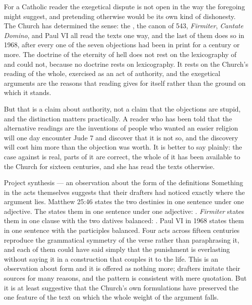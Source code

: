 For a Catholic reader the exegetical dispute is not open in the way the foregoing might suggest, and pretending otherwise would be its own kind of dishonesty. The Church has determined the sense: the , the canon of 543, \emph{Firmiter}, \emph{Cantate Domino}, and Paul VI all read the texts one way, and the last of them does so in 1968, after every one of the seven objections had been in print for a century or more. The doctrine of the eternity of hell does not rest on the lexicography of  and could not, because no doctrine rests on lexicography. It rests on the Church's reading of the whole, exercised as an act of authority, and the exegetical arguments are the reasons that reading gives for itself rather than the ground on which it stands.

But that is a claim about authority, not a claim that the objections are stupid, and the distinction matters practically. A reader who has been told that the alternative readings are the inventions of people who wanted an easier religion will one day encounter Jude 7 and discover that it is not so, and the discovery will cost him more than the objection was worth. It is better to say plainly: the case against is real, parts of it are correct, the whole of it has been available to the Church for sixteen centuries, and she has read the texts otherwise.

\begin{studybox}{Project synthesis --- an observation about the form of the definitions}
Something in the acts themselves suggests that their drafters had noticed exactly where the argument lies. Matthew 25:46 states the two destinies in one sentence under one adjective. The  states them in one sentence under one adjective: . \emph{Firmiter} states them in one clause with the two datives balanced: . Paul VI in 1968 states them in one sentence with the participles balanced. Four acts across fifteen centuries reproduce the grammatical symmetry of the verse rather than paraphrasing it, and each of them could have said simply that the punishment is everlasting without saying it in a construction that couples it to the life. This is an observation about form and it is offered as nothing more; drafters imitate their sources for many reasons, and the pattern is consistent with mere quotation. But it is at least suggestive that the Church's own formulations have preserved the one feature of the text on which the whole weight of the argument falls.
\end{studybox}
